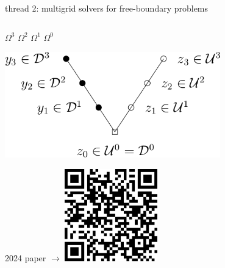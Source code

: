 \documentclass[svgnames,
               hyperref={colorlinks,citecolor=DeepPink4,linkcolor=FireBrick,urlcolor=Maroon},
               usepdftitle=false]  %
               {beamer}
\begin{document}
\begin{frame}{thread 2: multigrid solvers for free-boundary problems}
\begin{columns}
\begin{column}{0.4\textwidth}
{{\tiny
\hspace{3mm} $\Omega^3$ \hspace{9mm} $\Omega^2$ \hspace{9mm} $\Omega^1$ \hspace{9mm} $\Omega^0$ \hspace{1mm}
}

\vspace{5mm}
\includegraphics[width=0.7\textwidth]{figs/fascd-vcycle.png}\par}

\vspace{5mm}
\hfill {\tiny 2024 paper $\to$} \quad \href{https://epubs.siam.org/doi/10.1137/23M1594200}{\includegraphics[width=0.3\textwidth]{figs/QRbuelerfarrell.png}}
\end{column}
\end{columns}
\end{frame}
\end{document}

